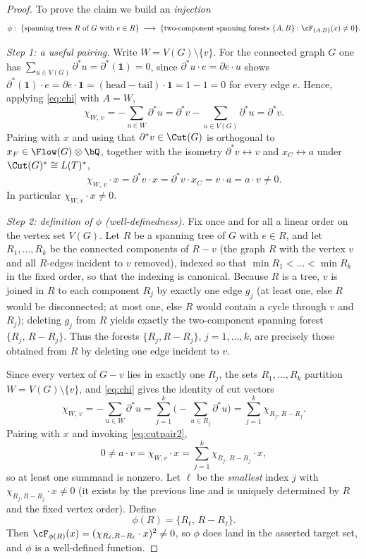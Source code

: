 \begin{proof}
To prove the claim we build an \emph{injection}
\[
\phi:\ \{\text{spanning trees $R$ of $G$ with $e\in R$}\}\ \longrightarrow\
\{\text{two-component spanning forests }\{A,B\}:\cF_{\{A,B\}}(x)\ne0\}.
\]

\smallskip\noindent\emph{Step 1: a useful pairing.}  Write $W=V(G)\setminus\{v\}$.  For the
connected graph $G$ one has $\sum_{u\in V(G)}\partial^\ast u=\partial^\ast(\mathbf 1)=0$,
since $\partial^\ast u\cdot e=\partial e\cdot u$ shows
$\partial^\ast(\mathbf 1)\cdot e=\partial e\cdot\mathbf 1=(\text{head}-\text{tail})\cdot
\mathbf 1=1-1=0$ for every edge $e$.  Hence, applying \eqref{eq:chi} with $A=W$,
\[
\chi_{W,\,v}=-\sum_{u\in W}\partial^\ast u
=\partial^\ast v-\sum_{u\in V(G)}\partial^\ast u=\partial^\ast v .
\]
Pairing with $x$ and using that $\partial^\ast v\in\Cut(G)$ is orthogonal to
$x_F\in\Flow(G)\otimes\bQ$, together with the isometry $\partial^\ast v\leftrightarrow v$ and
$x_C\leftrightarrow a$ under $\Cut(G)^\ast\cong L(T)^\ast$,
\begin{equation}
\label{eq:cutpair2}
\chi_{W,\,v}\cdot x=\partial^\ast v\cdot x=\partial^\ast v\cdot x_C=v\cdot a=a\cdot v\ne0 .
\end{equation}
In particular $\chi_{W,v}\cdot x\ne0$.

\smallskip\noindent\emph{Step 2: definition of $\phi$ (well-definedness).}  Fix once and for
all a linear order on the vertex set $V(G)$.  Let $R$ be a spanning tree of $G$ with $e\in R$,
and let $R_1,\dots,R_k$ be the connected components of $R-v$ (the graph $R$ with the vertex
$v$ and all $R$-edges incident to $v$ removed), indexed so that $\min R_1<\dots<\min R_k$ in
the fixed order, so that the indexing is canonical.  Because $R$ is a tree, $v$ is joined in
$R$ to each component $R_j$ by exactly one edge $g_j$ (at least one, else $R$ would be
disconnected; at most one, else $R$ would contain a cycle through $v$ and $R_j$); deleting
$g_j$ from $R$ yields exactly the two-component spanning forest $\{R_j,\,R-R_j\}$.  Thus the
forests $\{R_j,R-R_j\}$, $j=1,\dots,k$, are precisely those obtained from $R$ by deleting one
edge incident to $v$.

Since every vertex of $G-v$ lies in exactly one $R_j$, the sets $R_1,\dots,R_k$ partition
$W=V(G)\setminus\{v\}$, and \eqref{eq:chi} gives the identity of cut vectors
\[
\chi_{W,\,v}=-\sum_{u\in W}\partial^\ast u
=\sum_{j=1}^k\Big(-\sum_{u\in R_j}\partial^\ast u\Big)
=\sum_{j=1}^k\chi_{R_j,\,R-R_j}.
\]
Pairing with $x$ and invoking \eqref{eq:cutpair2},
\[
0\ne a\cdot v=\chi_{W,v}\cdot x=\sum_{j=1}^k\chi_{R_j,\,R-R_j}\cdot x,
\]
so at least one summand is nonzero.  Let $\ell$ be the \emph{smallest} index $j$ with
$\chi_{R_j,R-R_j}\cdot x\ne0$ (it exists by the previous line and is uniquely determined by
$R$ and the fixed vertex order).  Define
\[
\phi(R)=\{R_\ell,\,R-R_\ell\}.
\]
Then $\cF_{\phi(R)}(x)=(\chi_{R_\ell,R-R_\ell}\cdot x)^2\ne0$, so $\phi$ does land in the
asserted target set, and $\phi$ is a well-defined function.


\end{proof}

